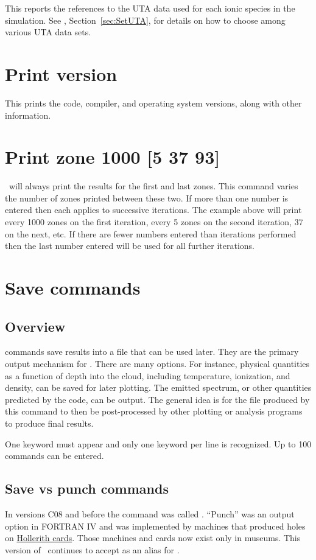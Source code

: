 This reports the references to the UTA data used for each ionic
species in the simulation.
See , Section~\ref{sec:SetUTA}, for details
on how to choose among various UTA data sets.

\section{Print version}

This prints the code, compiler, and operating system versions, along
with other information.

\section{Print zone 1000 [5 37 93]}

\Cloudy\ will always print the results for the first and last zones.  This
command varies the number of zones printed between these two.
If more than
one number is entered then each applies to successive iterations.  The
example above will print every 1000 zones on the first iteration, every
5 zones on the second iteration, 37 on the next, etc.  If there are fewer
numbers entered than iterations performed then the last number entered will
be used for all further iterations.

\section{Save commands}

\subsection{Overview}

 commands save results into a file that can be used later.
They
are the primary output mechanism for \Cloudy.
There are many options.
For
instance, physical quantities as a function of depth into the cloud,
including temperature, ionization, and density, can be saved for later
plotting.
The emitted spectrum, or other quantities predicted by the code,
can be output.
The general idea is for the file produced by this command to then
be post-processed by other plotting or analysis programs to produce final
results.

One keyword must appear and only one keyword per line is recognized.
Up to 100  commands can be entered.

\subsection{Save vs punch commands}
In versions C08 and before the  command was
called .
``Punch'' was an output option in FORTRAN IV and was implemented by 
machines that produced holes on 
\href{http://en.wikipedia.org/wiki/Punched_card}{Hollerith cards}.
Those machines and cards now exist only in museums. 
This version of \Cloudy\ continues to accept
 as an alias for .

